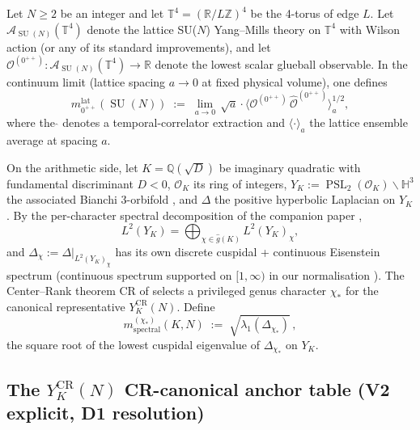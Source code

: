 \documentclass[11pt,a4paper,reqno]{amsart}
\theoremstyle{definition}
\DeclareMathOperator{\PSL}{PSL}
\DeclareMathOperator{\SU}{SU}
\newcommand{\OK}{\mathcal{O}_K}
\newcommand{\YK}{Y_K}
\newcommand{\YKCR}{Y_K^{\mathrm{CR}}}
\newcommand{\HH}{\mathbb{H}}
\newcommand{\ZZ}{\mathbb{Z}}
\newcommand{\QQ}{\mathbb{Q}}
\newcommand{\RR}{\mathbb{R}}
\newcommand{\TT}{\mathbb{T}}
\begin{document}
Let $N\ge 2$ be an integer and let $\TT^4 = (\RR/L\ZZ)^4$ be the 4-torus of edge $L$. Let $\mathcal{A}_{\SU(N)}(\TT^4)$ denote the lattice SU($N$) Yang--Mills theory on $\TT^4$ with Wilson action (or any of its standard improvements), and let $\mathcal{O}^{(0^{++})} : \mathcal{A}_{\SU(N)}(\TT^4) \to \RR$ denote the lowest scalar glueball observable. In the continuum limit (lattice spacing $a \to 0$ at fixed physical volume), one defines
\begin{equation}\label{eq:mlat}
   m_{0^{++}}^{\mathrm{lat}}(\SU(N))
   \;:=\; \lim_{a\to 0}\, \sqrt{a}\cdot\bigl\langle \mathcal{O}^{(0^{++})}\,\hat{\mathcal{O}}^{(0^{++})}\bigr\rangle^{1/2}_{a},
\end{equation}
where the $\hat{}$ denotes a temporal-correlator extraction and $\langle\cdot\rangle_a$ the lattice ensemble average at spacing $a$.

On the arithmetic side, let $K=\QQ(\sqrt{D})$ be imaginary quadratic with fundamental discriminant $D<0$, $\OK$ its ring of integers, $\YK := \PSL_2(\OK)\backslash\HH^3$ the associated Bianchi 3-orbifold \cite[\S 1.5]{ElstrodtGrunewaldMennicke1998}, and $\Delta$ the positive hyperbolic Laplacian on $\YK$. By the per-character spectral decomposition of the companion paper \cite{Remondiere2026Selberg},
\[
   L^2(\YK) = \bigoplus_{\chi \in \widehat{g}(K)} L^2(\YK)_\chi,
\]
and $\Delta_\chi := \Delta\big|_{L^2(\YK)_\chi}$ has its own discrete cuspidal + continuous Eisenstein spectrum (continuous spectrum supported on $[1,\infty)$ in our normalisation \cite[\S\S6.1, 7.4]{ElstrodtGrunewaldMennicke1998}). The Center--Rank theorem CR of \cite{Remondiere2026CenterRank} selects a privileged genus character $\chi_*$ for the canonical representative $\YKCR(N)$. Define
\begin{equation}\label{eq:mspectral}
   m^{(\chi_*)}_{\mathrm{spectral}}(K, N)
   \;:=\; \sqrt{\lambda_1(\Delta_{\chi_*})}\,,
\end{equation}
the square root of the lowest cuspidal eigenvalue of $\Delta_{\chi_*}$ on $\YK$.

\subsection{The $\YKCR(N)$ CR-canonical anchor table (V2 explicit, D1 resolution)}\label{ss:KASP}
\end{document}
